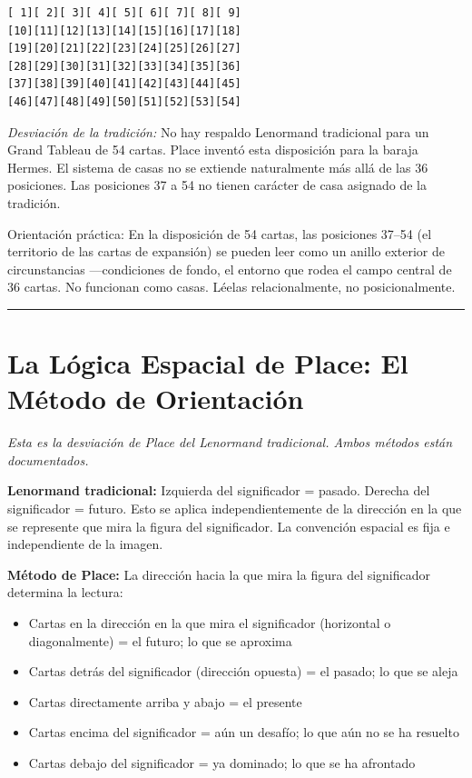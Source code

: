 \begin{verbatim}
[ 1][ 2][ 3][ 4][ 5][ 6][ 7][ 8][ 9]
[10][11][12][13][14][15][16][17][18]
[19][20][21][22][23][24][25][26][27]
[28][29][30][31][32][33][34][35][36]
[37][38][39][40][41][42][43][44][45]
[46][47][48][49][50][51][52][53][54]
\end{verbatim}

\emph{Desviación de la tradición:} No hay respaldo Lenormand tradicional para un Grand Tableau de 54 cartas. Place inventó esta disposición para la baraja Hermes. El sistema de casas no se extiende naturalmente más allá de las 36 posiciones. Las posiciones 37 a 54 no tienen carácter de casa asignado de la tradición.

Orientación práctica: En la disposición de 54 cartas, las posiciones 37--54 (el territorio de las cartas de expansión) se pueden leer como un anillo exterior de circunstancias ---condiciones de fondo, el entorno que rodea el campo central de 36 cartas. No funcionan como casas. Léelas relacionalmente, no posicionalmente.

\begin{center}\rule{0.5\linewidth}{0.5pt}\end{center}

\section{La Lógica Espacial de Place: El Método de Orientación}\label{places-spatial-logic-the-facing-direction-method}

\emph{Esta es la desviación de Place del Lenormand tradicional. Ambos métodos están documentados.}

\textbf{Lenormand tradicional:} Izquierda del significador = pasado. Derecha del significador = futuro. Esto se aplica independientemente de la dirección en la que se represente que mira la figura del significador. La convención espacial es fija e independiente de la imagen.

\textbf{Método de Place:} La dirección hacia la que mira la figura del significador determina la lectura:

\begin{itemize}
\tightlist
\item
  Cartas en la dirección en la que mira el significador (horizontal o diagonalmente) = el futuro; lo que se aproxima
\item
  Cartas detrás del significador (dirección opuesta) = el pasado; lo que se aleja
\item
  Cartas directamente arriba y abajo = el presente
\item
  Cartas encima del significador = aún un desafío; lo que aún no se ha resuelto
\item
  Cartas debajo del significador = ya dominado; lo que se ha afrontado
\end{itemize}

